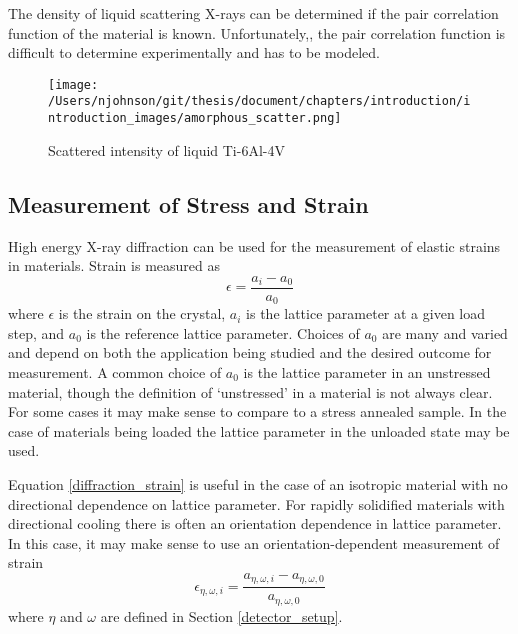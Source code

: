 The density of liquid scattering X-rays can be determined if the pair correlation function of the material is known. Unfortunately,, the pair correlation function is difficult to determine experimentally and has to be modeled.

\begin{figure}
	\texttt{[image: /Users/njohnson/git/thesis/document/chapters/introduction/introduction\_images/amorphous\_scatter.png]}
	\caption{Scattered intensity of liquid Ti-6Al-4V}
	\label{amorphous_scatter}
\end{figure}

\subsection{Measurement of Stress and Strain}\label{diffraction_stress_strain}
High energy X-ray diffraction can be used for the measurement of elastic strains in materials. Strain is measured as
\begin{equation}
	\epsilon = \frac{a_i - a_0}{a_0}
	\label{diffraction_strain}
\end{equation}
where $\epsilon$ is the strain on the crystal, $a_i$ is the lattice parameter at a given load step, and $a_0$ is the reference lattice parameter. Choices of $a_0$ are many and varied and depend on both the application being studied and the desired outcome for measurement. A common choice of $a_0$ is the lattice parameter in an unstressed material, though the definition of `unstressed' in a material is not always clear. For some cases it may make sense to compare to a stress annealed sample. In the case of materials being loaded the lattice parameter in the unloaded state may be used. 

Equation \ref{diffraction_strain} is useful in the case of an isotropic material with no directional dependence on lattice parameter. For rapidly solidified materials with directional cooling there is often an orientation dependence in lattice parameter. In this case, it may make sense to use an orientation-dependent measurement of strain
\begin{equation}
	\epsilon_{\eta,\omega,i} = \frac{a_{\eta,\omega,i} - a_{\eta,\omega,0}}{a_{\eta,\omega,0}}
	\label{directional_strain}
\end{equation}
where $\eta$ and $\omega$ are defined in Section \ref{detector_setup}. 

